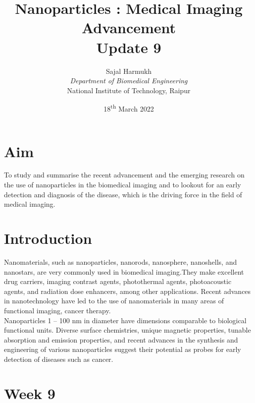 \documentclass{article}
\title{\textbf{Nanoparticles : Medical Imaging Advancement\\Update 9}}
\author{Sajal Harmukh \\ \textit{Department of Biomedical Engineering} \\ National Institute of Technology, Raipur }
\date{18\textsuperscript{th} March 2022}
\begin{document}
\maketitle

\section*{Aim}
\large
To study and summarise the recent advancement and the emerging research on the use of nanoparticles in the biomedical imaging and to lookout for an early detection and diagnosis of the disease, which is the driving force in the field of medical imaging.

\section*{Introduction}
Nanomaterials, such as nanoparticles, nanorods, nanosphere, nanoshells, and nanostars, are
very commonly used in biomedical imaging.They make excellent drug carriers, imaging contrast agents, photothermal agents, photoacoustic agents, and radiation dose enhancers, among other applications. Recent advances in nanotechnology have led to the use of nanomaterials
in many areas of functional imaging, cancer therapy.\\ Nanoparticles 1 – 100 nm in diameter have dimensions comparable to biological functional units. Diverse surface chemistries, unique magnetic properties, tunable absorption and emission properties, and recent advances in the synthesis and engineering of various nanoparticles suggest their potential as probes for early detection of diseases such as cancer.
 


\section*{Week 9 }
\end{document}
